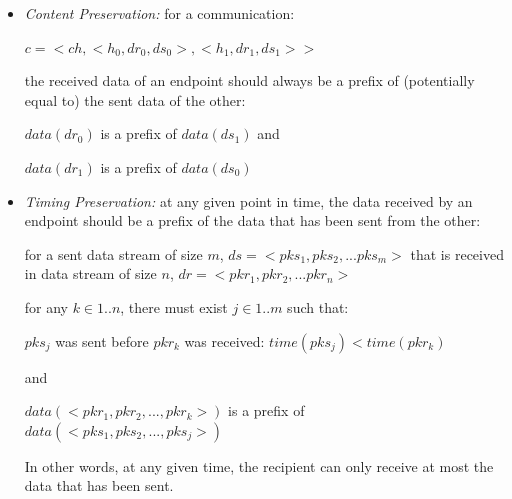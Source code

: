 \begin{itemize}
 \item \textit{Content Preservation:} for a communication:

$c = <ch, <h_0, dr_0, ds_0>, <h_1, dr_1, ds_1>>$

the received data of an endpoint should always be a prefix of (potentially equal to) the sent data of the other:

$data(dr_0)$ is a prefix of $data(ds_1)$  and

$data(dr_1)$ is a prefix of $data(ds_0)$

 \item \textit{Timing Preservation:} at any given point in time, the data received by an endpoint should be a prefix of the data that has been sent from the other:
 
for a sent data stream of size $m$, $ds= <pks_1, pks_2, ... pks_m>$ that is received in data stream of size $n$, $dr = <pkr_1, pkr_2, ... pkr_n>$

for any $k \in {1..n}$, there must exist $j \in {1..m}$ such that: 

$pks_j$ was sent before $pkr_k$ was received: $time(pks_j) < time(pkr_k)$

  and

$ data(<pkr_1, pkr_2, ..., pkr_k>)$ is a prefix of $data(<pks_1, pks_2, ..., pks_j>)$

In other words, at any given time, the recipient can only receive at most the data that has been sent.

\end{itemize}

